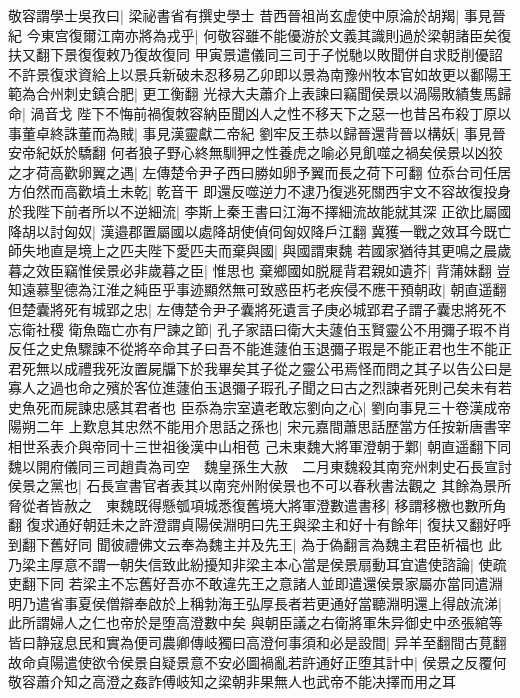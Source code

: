 敬容謂學士吳孜曰|{
	梁祕書省有撰史學士}
昔西晉祖尚玄虚使中原淪於胡羯|{
	事見晉紀}
今東宫復爾江南亦將為戎乎|{
	何敬容雖不能優游於文義其識則過於梁朝諸臣矣復扶又翻下景復復敕乃復故復同}
甲寅景遣儀同三司于子悦馳以敗聞併自求貶削優詔不許景復求資給上以景兵新破未忍移易乙卯即以景為南豫州牧本官如故更以鄱陽王範為合州刺史鎮合肥|{
	更工衡翻}
光禄大夫蕭介上表諫曰竊聞侯景以渦陽敗績隻馬歸命|{
	渦音戈}
陛下不悔前禍復敇容納臣聞凶人之性不移天下之惡一也昔呂布殺丁原以事董卓終誅董而為賊|{
	事見漢靈獻二帝紀}
劉牢反王恭以歸晉還背晉以構妖|{
	事見晉安帝紀妖於驕翻}
何者狼子野心終無馴狎之性養虎之喻必見飢噬之禍矣侯景以凶狡之才荷高歡卵翼之遇|{
	左傳楚令尹子西曰勝如卵予翼而長之荷下可翻}
位忝台司任居方伯然而高歡墳土未乾|{
	乾音干}
即還反噬逆力不逮乃復逃死關西宇文不容故復投身於我陛下前者所以不逆細流|{
	李斯上秦王書曰江海不擇細流故能就其深}
正欲比屬國降胡以討匈奴|{
	漢邉郡置屬國以處降胡使偵伺匈奴降戶江翻}
冀獲一戰之效耳今既亡師失地直是境上之匹夫陛下愛匹夫而棄與國|{
	與國謂東魏}
若國家猶待其更鳴之晨歲暮之效臣竊惟侯景必非歲暮之臣|{
	惟思也}
棄鄉國如脱屣背君親如遺芥|{
	背蒲妹翻}
豈知遠慕聖德為江淮之純臣乎事迹顯然無可致惑臣朽老疾侵不應干預朝政|{
	朝直遥翻}
但楚囊將死有城郢之忠|{
	左傳楚令尹子囊將死遺言子庚必城郢君子謂子囊忠將死不忘衛社稷}
衛魚臨亡亦有尸諫之節|{
	孔子家語曰衛大夫蘧伯玉賢靈公不用彌子瑕不肖反任之史魚驟諫不從將卒命其子曰吾不能進蘧伯玉退彌子瑕是不能正君也生不能正君死無以成禮我死汝置屍牖下於我畢矣其子從之靈公弔焉怪而問之其子以告公曰是寡人之過也命之殯於客位進蘧伯玉退彌子瑕孔子聞之曰古之烈諫者死則己矣未有若史魚死而屍諫忠感其君者也}
臣忝為宗室遺老敢忘劉向之心|{
	劉向事見三十卷漢成帝陽朔二年}
上歎息其忠然不能用介思話之孫也|{
	宋元嘉間蕭思話歷當方任按新唐書宰相世系表介與帝同十三世祖後漢中山相苞}
己未東魏大將軍澄朝于鄴|{
	朝直遥翻下同}
魏以開府儀同三司趙貴為司空　魏皇孫生大赦　二月東魏殺其南兖州刺史石長宣討侯景之黨也|{
	石長宣書官者表其以南兖州附侯景也不可以春秋書法觀之}
其餘為景所脅從者皆赦之　東魏既得懸瓠項城悉復舊境大將軍澄數遣書移|{
	移謂移檄也數所角翻}
復求通好朝廷未之許澄謂貞陽侯淵明曰先王與梁主和好十有餘年|{
	復扶又翻好呼到翻下舊好同}
聞彼禮佛文云奉為魏主并及先王|{
	為于偽翻言為魏主君臣祈福也}
此乃梁主厚意不謂一朝失信致此紛擾知非梁主本心當是侯景扇動耳宜遣使諮論|{
	使疏吏翻下同}
若梁主不忘舊好吾亦不敢違先王之意諸人並即遣還侯景家屬亦當同遣淵明乃遣省事夏侯僧辯奉啟於上稱勃海王弘厚長者若更通好當聽淵明還上得啟流涕|{
	此所謂婦人之仁也帝於是堕高澄數中矣}
與朝臣議之右衛將軍朱异御史中丞張綰等皆曰静寇息民和實為便司農卿傳岐獨曰高澄何事須和必是設間|{
	异羊至翻間古莧翻}
故命貞陽遣使欲令侯景自疑景意不安必圖禍亂若許通好正堕其計中|{
	侯景之反覆何敬容蕭介知之高澄之姦詐傅岐知之梁朝非果無人也武帝不能决擇而用之耳}
